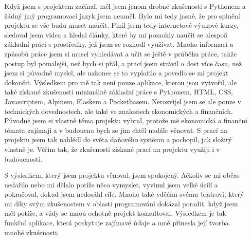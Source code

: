 \documentclass[11pt,a4paper,twoside,openright]{report}
\let\openright=\cleardoublepage
\begin{document}
Když jsem s projektem začínal, měl jsem jenom drobné zkušenosti s Pythonem a žádný jiný programovací jazyk jsem neuměl. Bylo mi tedy jasné, že pro splnění projektu se vše budu muset naučit. Plnil jsem tedy internetové výukové kurzy, sledoval jsem videa a hledal články, které by mi pomohly naučit se alespoň základní práci s prostředky, jež jsem se rozhodl využívat. Mnoho informací a způsobů práce jsem si musel vyhledávat a učit se ještě v průběhu práce, takže postup byl pomalejší, než bych si přál, a prací jsem strávil o dost více času, než jsem si původně myslel, ale nakonec se to vyplatilo a povedlo se mi projekt dokončit. Výsledkem pro mě tak není pouze aplikace, kterou jsou vytvořil, ale také získané zkušenosti minimálně základní práce s Pythonem, HTML, CSS, Javascriptem, Alpinem, Flaskem a Pocketbasem. Nerozvíjel jsem se ale pouze v technických dovednostech, ale také ve znalostech ekonomických a finančních. Původně jsem si vlastně téma projektu vybral, protože mě ekonomická a finanční témata zajímají a v budoucnu bych se jim chtěl nadále věnovat. S prací na projektu jsem tak nahlédl do světa daňového systému a pochopil, jak složitý vlastně je. Věřím tak, že zkušenosti získané prací na projektu využiji i v budoucnosti.

S výsledkem, který jsem projektu věnoval, jsem spokojený. Ačkoliv se mi občas nedařilo nebo mi dělalo potíže něco vymyslet, vyvinul jsem velké úsilí a pokračoval, dokud jsem nedosáhl cíle. Mnoho také vděčím svému bratrovi, který mi díky svým zkušenostem v oblasti programování dokázal poradit, když jsem měl potíže, a vždy se mnou ochotně projekt konzultoval. Výsledkem je tak funkční aplikace, která poskytuje zajímavé údaje a mně přinesla její tvorba mnohé zkušenosti.

\nocite{einstein}\nocite{latexcompanion}\nocite{knuthwebsite}
\printbibliography[title={Seznam použité literatury},heading={bibintoc}]

\openright
\listoffigures
{}

\clearpage
\listoftables
{}


\end{document}
